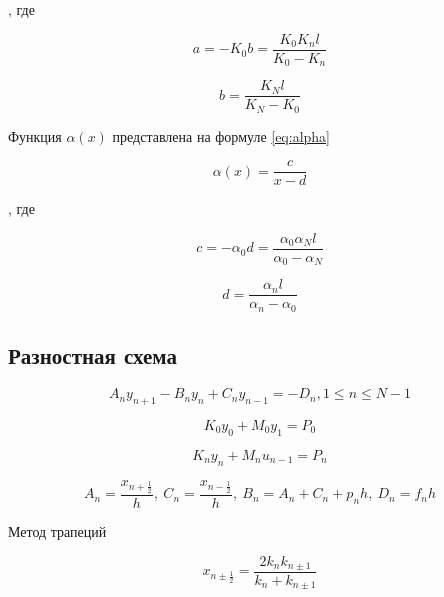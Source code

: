 , где

\begin{equation*}
    a = -K_0 b = \frac{K_0 K_n l}{K_0 - K_n}
\end{equation*}

\begin{equation*}
    b = \frac{K_N l}{K_N - K_0}
\end{equation*}

Функция $\alpha(x)$ представлена на формуле \ref{eq:alpha}

\begin{equation}\label{eq:alpha}
    \alpha(x) = \frac{c}{x- d}
\end{equation}

, где

\begin{equation*}
    c = -\alpha_0d = \frac{\alpha_0 \alpha_N l}{\alpha_0 - \alpha_N}
\end{equation*}

\begin{equation*}
    d = \frac{\alpha_n l}{\alpha_n - \alpha_0}
\end{equation*}

\subsection{Разностная схема}

\begin{equation}\label{eq:main}
    A_n y_{n+1} - B_n y_n + C_n y_{n-1} = -D_n, 1 \le n \le N-1
\end{equation}

\begin{equation}\label{eq:start_left}
    K_0 y_0 + M_0 y_1 = P_0
\end{equation}

\begin{equation}\label{eq:start_right}
    K_n y_n + M_n u_{n-1} = P_n
\end{equation}

\begin{equation*}
    A_n = \frac{x_{n+\frac{1}{2}}}{h},\ C_n = \frac{x_{n-\frac{1}{2}}}{h},
    \ B_n = A_n + C_n + p_n h,\ D_n = f_nh
\end{equation*}

Метод трапеций

\begin{equation*}
    x_{n \pm \frac{1}{2}} = \frac{2 k_n k_{n\pm1}}{k_n + k_{n\pm1}}
\end{equation*}

